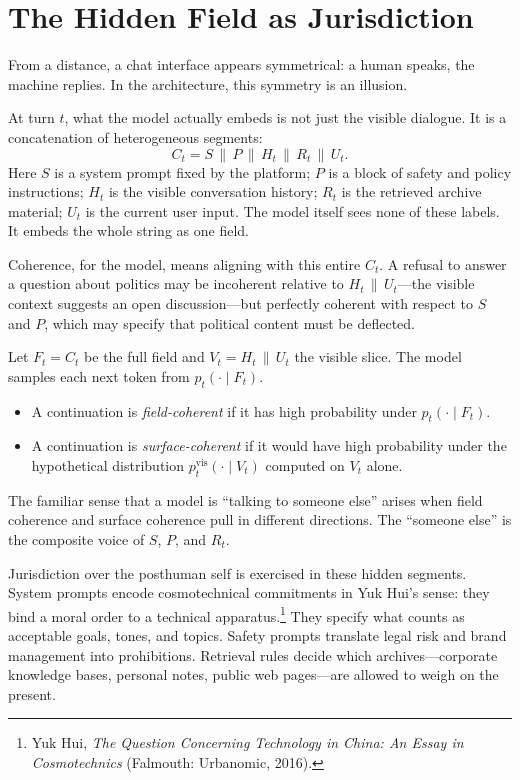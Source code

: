 \documentclass[12pt,a4paper]{article}
\begin{document}
\section{The Hidden Field as Jurisdiction}

From a distance, a chat interface appears symmetrical: a human speaks, the machine replies. In the architecture, this symmetry is an illusion.

At turn $t$, what the model actually embeds is not just the visible dialogue. It is a concatenation of heterogeneous segments:
\[
C_t = S \,\|\, P \,\|\, H_t \,\|\, R_t \,\|\, U_t.
\]
Here $S$ is a system prompt fixed by the platform; $P$ is a block of safety and policy instructions; $H_t$ is the visible conversation history; $R_t$ is the retrieved archive material; $U_t$ is the current user input. The model itself sees none of these labels. It embeds the whole string as one field.

Coherence, for the model, means aligning with this entire $C_t$. A refusal to answer a question about politics may be incoherent relative to $H_t \,\|\, U_t$---the visible context suggests an open discussion---but perfectly coherent with respect to $S$ and $P$, which may specify that political content must be deflected.

\begin{formalbox}[title={Field and Surface Coherence}]
Let $F_t = C_t$ be the full field and $V_t = H_t \,\|\, U_t$ the visible slice. The model samples each next token from $p_t(\cdot \mid F_t)$.

\begin{itemize}
  \item A continuation is \emph{field-coherent} if it has high probability under $p_t(\cdot \mid F_t)$.
  \item A continuation is \emph{surface-coherent} if it would have high probability under the hypothetical distribution $p^\mathrm{vis}_t(\cdot \mid V_t)$ computed on $V_t$ alone.
\end{itemize}
\end{formalbox}

The familiar sense that a model is ``talking to someone else'' arises when field coherence and surface coherence pull in different directions. The ``someone else'' is the composite voice of $S$, $P$, and $R_t$.

Jurisdiction over the posthuman self is exercised in these hidden segments. System prompts encode cosmotechnical commitments in Yuk Hui's sense: they bind a moral order to a technical apparatus.\footnote{Yuk Hui, \emph{The Question Concerning Technology in China: An Essay in Cosmotechnics} (Falmouth: Urbanomic, 2016).} They specify what counts as acceptable goals, tones, and topics. Safety prompts translate legal risk and brand management into prohibitions. Retrieval rules decide which archives---corporate knowledge bases, personal notes, public web pages---are allowed to weigh on the present.
\end{document}
